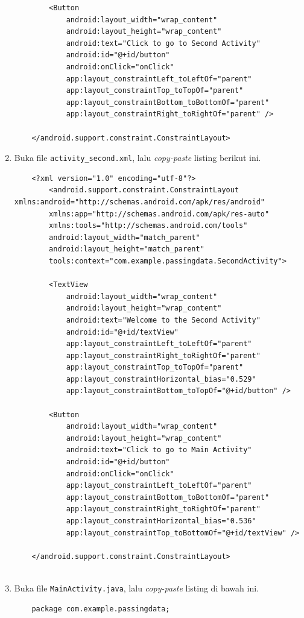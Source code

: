\documentclass{scrartcl}
\begin{document}
\begin{enumerate}
\begin{verbatim}
		<Button
			android:layout_width="wrap_content"
			android:layout_height="wrap_content"
			android:text="Click to go to Second Activity"
			android:id="@+id/button"
			android:onClick="onClick"
			app:layout_constraintLeft_toLeftOf="parent"
			app:layout_constraintTop_toTopOf="parent"
			app:layout_constraintBottom_toBottomOf="parent"
			app:layout_constraintRight_toRightOf="parent" />
	
	</android.support.constraint.ConstraintLayout>
	\end{verbatim}
	
	\item Buka file \texttt{activity\_second.xml}, lalu \textit{copy-paste} listing berikut ini.
	
	\begin{verbatim}
	<?xml version="1.0" encoding="utf-8"?>
		<android.support.constraint.ConstraintLayout xmlns:android="http://schemas.android.com/apk/res/android"
		xmlns:app="http://schemas.android.com/apk/res-auto"
		xmlns:tools="http://schemas.android.com/tools"
		android:layout_width="match_parent"
		android:layout_height="match_parent"
		tools:context="com.example.passingdata.SecondActivity">
		
		<TextView
			android:layout_width="wrap_content"
			android:layout_height="wrap_content"
			android:text="Welcome to the Second Activity"
			android:id="@+id/textView"
			app:layout_constraintLeft_toLeftOf="parent"
			app:layout_constraintRight_toRightOf="parent"
			app:layout_constraintTop_toTopOf="parent"
			app:layout_constraintHorizontal_bias="0.529"
			app:layout_constraintBottom_toTopOf="@+id/button" />
		
		<Button
			android:layout_width="wrap_content"
			android:layout_height="wrap_content"
			android:text="Click to go to Main Activity"
			android:id="@+id/button"
			android:onClick="onClick"
			app:layout_constraintLeft_toLeftOf="parent"
			app:layout_constraintBottom_toBottomOf="parent"
			app:layout_constraintRight_toRightOf="parent"
			app:layout_constraintHorizontal_bias="0.536"
			app:layout_constraintTop_toBottomOf="@+id/textView" />
	
	</android.support.constraint.ConstraintLayout>
	
	\end{verbatim}
	
	\item Buka file \texttt{MainActivity.java}, lalu \textit{copy-paste} listing di bawah ini.
	
	\begin{verbatim}
	package com.example.passingdata;
	

\end{verbatim}
\end{enumerate}
\end{document}
